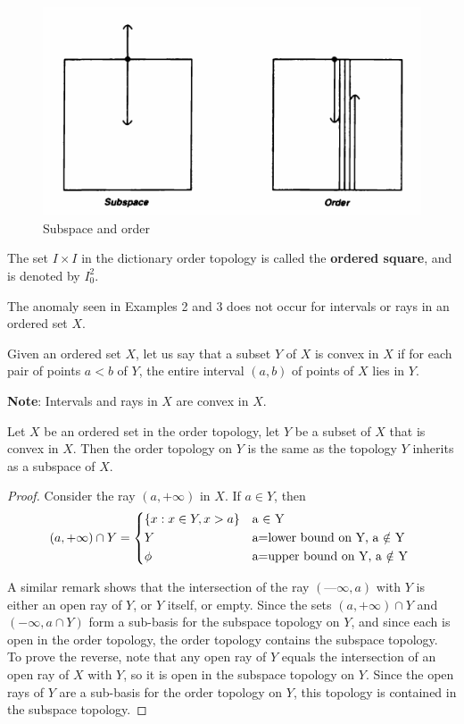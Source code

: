 \documentclass[a4paper,english,12pt]{article}
\begin{document}
\begin{figure}
	\centering
	\includegraphics[width=0.8\linewidth]{Figures/Lecture15_Fig1}
	\caption{Subspace and order}
	\label{fig1}
\end{figure}

\begin{defn}
	The set $I \times I$ in the dictionary order topology is called the \textbf{ordered square}, and is denoted by $I_0^2$.
\end{defn}

The anomaly seen in Examples 2 and 3 does not occur for intervals or rays in an ordered set $X$.
\begin{defn}
	Given an ordered set $X$, let us say that a subset $Y$ of $X$ is convex in $X$ if for each pair of points $a < b$ of $Y$, the entire interval $(a,b)$ of points of $X$ lies in $Y$. 
\end{defn}
\textbf{Note}: Intervals and rays in $X$ are convex in $X$.

\begin{thm}
	Let $X$ be an ordered set in the order topology, let $Y$ be a subset
	of $X$ that is convex in $X$. Then the order topology on $Y$ is the same as the topology $Y$	inherits as a subspace of $X$.
\end{thm}

\begin{proof}
	Consider the ray $(a, +\infty)$ in $X$. If $a \in Y$, then
	\[(a, +\infty) \cap Y = 
		\begin{dcases*}
			\{x : x \in Y , x > a\} & a $\in$ Y\\
			Y & a=lower bound on Y, a $\notin$ Y\\
			\phi  & a=upper bound on Y, a $\notin$ Y
		\end{dcases*}
	\]
	
		A similar remark shows that the intersection of the ray $(—\infty, a)$ with $Y$ is either	an open ray of $Y$, or $Y$ itself, or empty. Since the sets $(a, +\infty) \cap Y$ and $(-\infty,a \cap Y)$ form a sub-basis for the subspace topology on $Y$, and since each is open in the order topology, the order topology contains the subspace topology.\\
		To prove the reverse, note that any open ray of $Y$ equals the intersection of an open ray of $X$ with $Y$, so it is open in the subspace topology on $Y$. Since the open rays of $Y$ are a sub-basis for the order topology on $Y$, this topology is contained in the subspace topology.
\end{proof}
\end{document}
